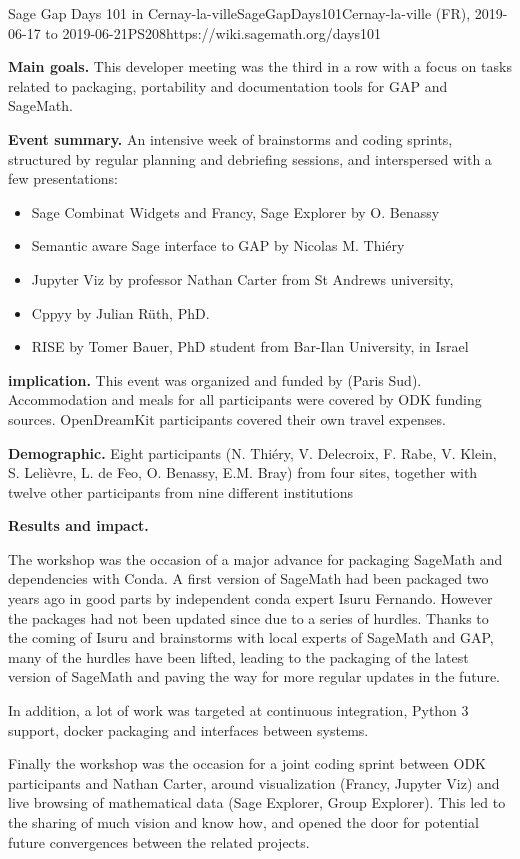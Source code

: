 \begin{event}{Sage Gap Days 101 in Cernay-la-ville}{SageGapDays101}{Cernay-la-ville (FR), 2019-06-17 to 2019-06-21}{PS}{20}{8}{https://wiki.sagemath.org/days101}

\textbf{Main goals.} This developer meeting was the third in a row
with a focus on \ODK tasks related to packaging, portability and
documentation tools for GAP and SageMath.


\textbf{Event summary.} An intensive week of brainstorms and coding
sprints, structured by regular planning and debriefing sessions, and
interspersed with a few presentations:
\begin{itemize}
\item Sage Combinat Widgets and Francy, Sage Explorer by O. Benassy
\item Semantic aware Sage interface to GAP by Nicolas M. Thiéry
\item Jupyter Viz by professor Nathan Carter from St Andrews
  university,
\item Cppyy by Julian Rüth, PhD.
\item RISE by Tomer Bauer, PhD student from Bar-Ilan University, in
  Israel
\end{itemize}

\textbf{\ODK implication.} This event was organized and funded by \ODK
(Paris Sud). Accommodation and meals for all participants were covered
by ODK funding sources. OpenDreamKit participants covered their own
travel expenses.

\textbf{Demographic.} Eight \ODK participants (N. Thiéry, V.
Delecroix, F. Rabe, V. Klein, S. Lelièvre, L. de Feo, O. Benassy, E.M.
Bray) from four sites, together with twelve other participants from
nine different institutions

\textbf{Results and impact.}

The workshop was the occasion of a major advance for packaging
SageMath and dependencies with Conda. A first version of SageMath had
been packaged two years ago in good parts by independent conda expert
Isuru Fernando. However the packages had not been updated since due to
a series of hurdles. Thanks to the coming of Isuru and brainstorms
with local experts of SageMath and GAP, many of the hurdles have been
lifted, leading to the packaging of the latest version of SageMath and
paving the way for more regular updates in the future.

In addition, a lot of work was targeted at continuous integration,
Python 3 support, docker packaging and interfaces between systems.

Finally the workshop was the occasion for a joint coding sprint
between ODK participants and Nathan Carter, around visualization
(Francy, Jupyter Viz) and live browsing of mathematical data (Sage
Explorer, Group Explorer). This led to the sharing of much vision and
know how, and opened the door for potential future convergences
between the related projects.
\end{event}
